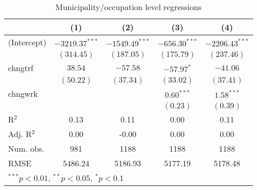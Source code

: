 
\begin{table}
\caption{Municipality/occupation level regressions}
\begin{center}
\begin{tabular}{l c c c c }
\hline
 & (1) & (2) & (3) & (4) \\
\hline
(Intercept) & $-3219.37^{***}$ & $-1549.49^{***}$ & $-656.30^{***}$ & $-2206.43^{***}$ \\
            & $(314.45)$       & $(187.05)$       & $(175.79)$      & $(237.46)$       \\
chngtrf     & $38.54$          & $-57.58$         & $-57.97^{*}$    & $-41.06$         \\
            & $(50.22)$        & $(37.34)$        & $(33.02)$       & $(37.41)$        \\
chngwrk     &                  &                  & $0.60^{***}$    & $1.58^{***}$     \\
            &                  &                  & $(0.23)$        & $(0.39)$         \\
\hline
R$^2$       & 0.13             & 0.11             & 0.00            & 0.11             \\
Adj. R$^2$  & 0.00             & -0.00            & 0.00            & 0.00             \\
Num. obs.   & 981              & 1188             & 1188            & 1188             \\
RMSE        & 5486.24          & 5186.93          & 5177.19         & 5178.48          \\
\hline
\multicolumn{5}{l}{\scriptsize{$^{***}p<0.01$, $^{**}p<0.05$, $^*p<0.1$}}
\end{tabular}
\label{table:coefficients}
\end{center}
\end{table}
